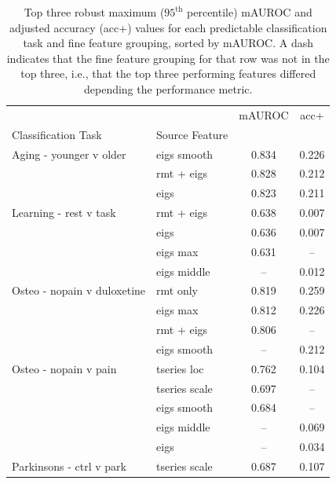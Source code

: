 \documentclass[12pt]{spieman}  %
\begin{document}
\begin{spacing}{2}
\begin{table}[h!]
\caption{
\label{tab:top3-fine}
Top three robust maximum (\(95^{\text{th}}\) percentile) mAUROC and adjusted
accuracy (acc+) values for each predictable classification task and fine
feature grouping, sorted by mAUROC. A dash indicates that the fine feature
grouping for that row was not in the top three, i.e., that the top three
performing features differed depending the performance metric. }
\small
\centering
\begin{tabular}{llcc}
\hline
                                   &               & mAUROC &   acc+ \\
Classification Task                & Source Feature&        &        \\
\hline
Aging - younger v older            & eigs smooth   &  0.834 &  0.226 \\
                                   & rmt + eigs    &  0.828 &  0.212 \\
                                   & eigs          &  0.823 &  0.211 \\
Learning - rest v task             & rmt + eigs    &  0.638 &  0.007 \\
                                   & eigs          &  0.636 &  0.007 \\
                                   & eigs max      &  0.631 &    –   \\
                                   & eigs middle   &    –   &  0.012 \\
Osteo - nopain v duloxetine        & rmt only      &  0.819 &  0.259 \\
                                   & eigs max      &  0.812 &  0.226 \\
                                   & rmt + eigs    &  0.806 &    –   \\
                                   & eigs smooth   &    –   &  0.212 \\
Osteo - nopain v pain              & tseries loc   &  0.762 &  0.104 \\
                                   & tseries scale &  0.697 &    –   \\
                                   & eigs smooth   &  0.684 &    –   \\
                                   & eigs middle   &    –   &  0.069 \\
                                   & eigs          &    –   &  0.034 \\
Parkinsons - ctrl v park           & tseries scale &  0.687 &  0.107 \\

\end{tabular}
\end{table}
\end{spacing}
\end{document}
